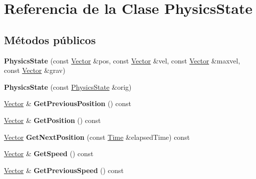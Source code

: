 \hypertarget{classPhysicsState}{\section{Referencia de la Clase Physics\-State}
\label{classPhysicsState}
}
\subsection*{Métodos públicos}
\begin{DoxyCompactItemize}
\item 
\hypertarget{classPhysicsState_afb658d4c118ac9fdbce1dd90e86f5a36}{{\bfseries Physics\-State} (const \hyperlink{classVector}{Vector} \&pos, const \hyperlink{classVector}{Vector} \&vel, const \hyperlink{classVector}{Vector} \&maxvel, const \hyperlink{classVector}{Vector} \&grav)}\label{classPhysicsState_afb658d4c118ac9fdbce1dd90e86f5a36}

\item 
\hypertarget{classPhysicsState_a993236e754859ea4aa3ae138c5e3f27f}{{\bfseries Physics\-State} (const \hyperlink{classPhysicsState}{Physics\-State} \&orig)}\label{classPhysicsState_a993236e754859ea4aa3ae138c5e3f27f}

\item 
\hypertarget{classPhysicsState_aba9b81d07ab8ff382c6a1986008e625c}{\hyperlink{classVector}{Vector} \& {\bfseries Get\-Previous\-Position} () const }\label{classPhysicsState_aba9b81d07ab8ff382c6a1986008e625c}

\item 
\hypertarget{classPhysicsState_a6f5f4fea36b71bd1586186339b7e1750}{\hyperlink{classVector}{Vector} \& {\bfseries Get\-Position} () const }\label{classPhysicsState_a6f5f4fea36b71bd1586186339b7e1750}

\item 
\hypertarget{classPhysicsState_aca460ceade0d84d8c531a30182a765ff}{\hyperlink{classVector}{Vector} {\bfseries Get\-Next\-Position} (const \hyperlink{classTime}{Time} \&elapsed\-Time) const }\label{classPhysicsState_aca460ceade0d84d8c531a30182a765ff}

\item 
\hypertarget{classPhysicsState_a2f5a9130fb97919b0995690e11873959}{\hyperlink{classVector}{Vector} \& {\bfseries Get\-Speed} () const }\label{classPhysicsState_a2f5a9130fb97919b0995690e11873959}

\item 
\hypertarget{classPhysicsState_a9a4415b9adf984fdc8da5e6ef6645d50}{\hyperlink{classVector}{Vector} \& {\bfseries Get\-Previous\-Speed} () const }\label{classPhysicsState_a9a4415b9adf984fdc8da5e6ef6645d50}


\end{DoxyCompactItemize}
